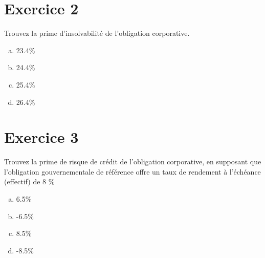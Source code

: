\documentclass[10pt,a4paper]{article}
\begin{document}
\section{Exercice 2}
Trouvez la prime d’insolvabilité de l'obligation corporative.
\begin{enumerate}[a)]
\item 23.4\%
\item 24.4\%
\item 25.4\%
\item 26.4\%
\end{enumerate}

\section{Exercice 3}
Trouvez la prime de risque de crédit de l'obligation corporative,  en supposant que l’obligation gouvernementale de référence offre un taux de rendement à l’échéance (effectif) de 8 \%
\begin{enumerate}[a)]
\item 6.5\%
\item -6.5\%
\item 8.5\%
\item -8.5\%
\end{enumerate}
\end{document}
